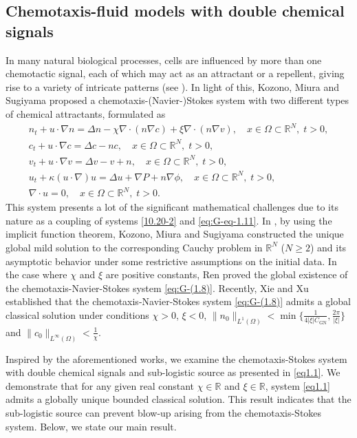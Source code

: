 \documentclass[reqno]{amsart}
\begin{document}
\subsection*{Chemotaxis-fluid models with double chemical signals} 
In many natural biological processes, cells are influenced by more than one chemotactic
signal, each of which may act as an attractant or a repellent, giving rise to a 
variety of intricate patterns (see \cite{Painter}). In light of this,
Kozono,  Miura and Sugiyama \cite{kozono} proposed a chemotaxis-(Navier-)Stokes 
system with two different types of chemical attractants, formulated as 
\begin{equation}\label{eq:G-(1.8)}
\begin{gathered}
n_t + u \cdot \nabla n = \Delta n - \chi \nabla \cdot (n\nabla c) 
 + \xi \nabla \cdot (n\nabla v), \quad x \in \Omega\subset \mathbb{R}^N,\; t > 0, \\
c_t + u \cdot \nabla c = \Delta c - nc, \quad
 x \in \Omega\subset \mathbb{R}^N,\; t > 0, \\
v_t + u \cdot \nabla v= \Delta v - v + n, \quad
 x \in \Omega\subset \mathbb{R}^N,\; t > 0, \\
u_t + \kappa (u \cdot \nabla) u  = \Delta u + \nabla P + n\nabla \phi,  \quad
 x \in \Omega\subset \mathbb{R}^N,\; t > 0, \\
\nabla \cdot u = 0,  \quad x \in \Omega\subset \mathbb{R}^N,\; t > 0.
\end{gathered}
\end{equation}
This system presents a lot of the significant mathematical challenges due to its 
nature as a coupling of systems \eqref{10.20-2} and \eqref{eq:G-eq-1.11}. 
In \cite{kozono}, by using the implicit function theorem, Kozono,  Miura and Sugiyama 
constructed the unique global mild solution to the corresponding Cauchy problem in
$\mathbb{R}^N$ ($N \geq 2$) and its asymptotic behavior under some restrictive 
assumptions on the initial data. In the case where $\chi$ and $\xi$ are
positive constants, Ren \cite{G-35} proved the global existence of the 
chemotaxis-Navier-Stokes system \eqref{eq:G-(1.8)}. Recently, Xie and Xu
\cite{Global-1} established that the chemotaxis-Navier-Stokes system 
\eqref{eq:G-(1.8)} admits a global classical solution under
conditions $ \chi > 0$, $ \xi < 0$, 
$\|n_0\|_{L^1(\Omega)} < \min \{ \frac{1}{4| \xi | C_{\mathrm{GN}}}, 
\frac{2\pi}{ |\xi| } \}$ and
$\|c_0\|_{L^\infty(\Omega)} < \frac{1}{\chi}$. 

Inspired by the aforementioned works, we examine the chemotaxis-Stokes system 
with double chemical signals and sub-logistic source as
presented in \eqref{eq1.1}. We demonstrate that for any given real constant 
$ \chi \in \mathbb{R}$ and $ \xi\in \mathbb{R}$, system \eqref{eq1.1} admits a 
globally unique bounded classical solution. 
This result indicates that the sub-logistic source can prevent blow-up arising 
from the chemotaxis-Stokes system. Below, we state our main result.
\end{document}
